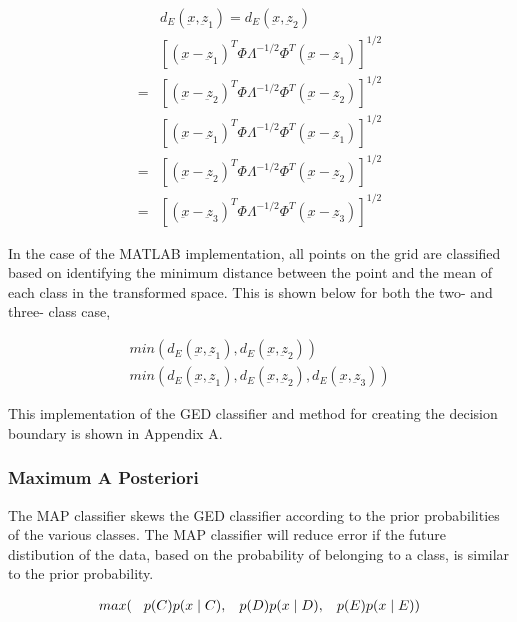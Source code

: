 \begin{eqnarray}
\label{eqn:boundary-GED}
& d_{E} (\underbar{x},\underbar{z}_{1}) = d_{E} (\underbar{x},\underbar{z}_{2}) \\
& \left [ (\underbar{x}-\underbar{z}_{1})^{T}\Phi\Lambda^{-1/2}\Phi^{T}(\underbar{x}-\underbar{z}_{1}) \right ]^{1/2} \\
= & \left [ (\underbar{x}-\underbar{z}_{2})^{T}\Phi\Lambda^{-1/2}\Phi^{T}(\underbar{x}-\underbar{z}_{2}) \right ]^{1/2}  \nonumber \\
&\left [ (\underbar{x}-\underbar{z}_{1})^{T}\Phi\Lambda^{-1/2}\Phi^{T}(\underbar{x}-\underbar{z}_{1}) \right ]^{1/2} \\
= &\left [ (\underbar{x}-\underbar{z}_{2})^{T}\Phi\Lambda^{-1/2}\Phi^{T}(\underbar{x}-\underbar{z}_{2}) \right ]^{1/2}  \nonumber \\
= &\left [ (\underbar{x}-\underbar{z}_{3})^{T}\Phi\Lambda^{-1/2}\Phi^{T}(\underbar{x}-\underbar{z}_{3}) \right ]^{1/2}  \nonumber
\end{eqnarray}



In the case of the MATLAB implementation, all points on the grid are classified based on identifying the minimum distance between the point and the mean of each class in the transformed space. This is shown below for both the two- and three- class case,

\begin{eqnarray}
\label{eqn:pointClass-GED}
min(d_{E} (\underbar{x},\underbar{z}_{1}), d_{E} (\underbar{x},\underbar{z}_{2})) \\
min(d_{E} (\underbar{x},\underbar{z}_{1}), d_{E} (\underbar{x},\underbar{z}_{2}), d_{E} (\underbar{x},\underbar{z}_{3}))
\end{eqnarray}


This implementation of the GED classifier and method for creating the decision boundary is shown in Appendix A.

\subsubsection{Maximum A Posteriori}

The MAP classifier skews the GED classifier according to the prior probabilities of the various classes. The MAP classifier will reduce error if the future distibution of the data, based on the probability of belonging to a class, is similar to the prior probability.

\begin{eqnarray}
max( \hspace{3mm} p(C)p(x\mid C), \hspace{3mm} p(D)p(x\mid D), \hspace{3mm} p(E)p(x\mid E) ) 
\end{eqnarray}


